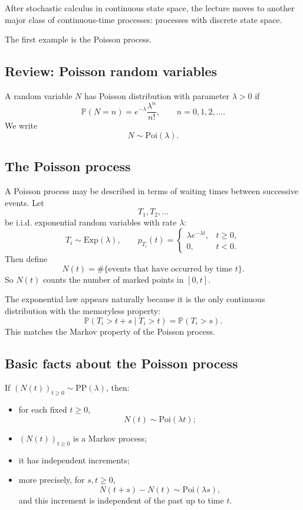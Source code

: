 \documentclass[11pt]{article}
\theoremstyle{definition}
\begin{document}
After stochastic calculus in continuous state space, the lecture moves to another major class of continuous-time processes: processes with discrete state space.

The first example is the Poisson process.

\subsection{Review: Poisson random variables}

A random variable $N$ has Poisson distribution with parameter $\lambda>0$ if
\[
\mathbb P(N=n)=e^{-\lambda}\frac{\lambda^n}{n!},
\qquad n=0,1,2,\dots.
\]
We write
\[
N\sim \mathrm{Poi}(\lambda).
\]

\subsection{The Poisson process}

A Poisson process may be described in terms of waiting times between successive events.
Let
\[
T_1,T_2,\dots
\]
be i.i.d. exponential random variables with rate $\lambda$:
\[
T_i\sim \mathrm{Exp}(\lambda),
\qquad
p_{T_i}(t)=
\begin{cases}
\lambda e^{-\lambda t}, & t\ge 0,\\
0, & t<0.
\end{cases}
\]
Then define
\[
N(t)=\#\{\text{events that have occurred by time }t\}.
\]
So $N(t)$ counts the number of marked points in $[0,t]$.

The exponential law appears naturally because it is the only continuous distribution with the memoryless property:
\[
\mathbb P(T_i>t+s\mid T_i>t)=\mathbb P(T_i>s).
\]
This matches the Markov property of the Poisson process.

\subsection{Basic facts about the Poisson process}

If $(N(t))_{t\ge 0}\sim \mathrm{PP}(\lambda)$, then:
\begin{itemize}[leftmargin=2em]
    \item for each fixed $t\ge 0$,
    \[
    N(t)\sim \mathrm{Poi}(\lambda t);
    \]
    \item $(N(t))_{t\ge 0}$ is a Markov process;
    \item it has independent increments;
    \item more precisely, for $s,t\ge 0$,
    \[
    N(t+s)-N(t)\sim \mathrm{Poi}(\lambda s),
    \]
    and this increment is independent of the past up to time $t$.
\end{itemize}
\end{document}
